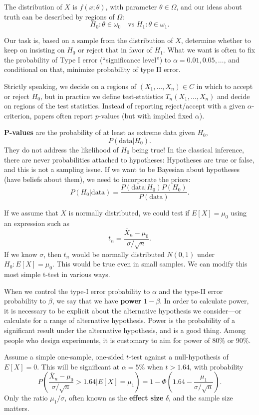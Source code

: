 \documentclass[twoside]{article}
\begin{document}
The distribution of $X$ is $f(x;\theta)$, with parameter
$\theta\in\Omega$, and our ideas about truth can be described by
regions of $\Omega$:
\[ H_0: \theta\in\omega_0 \quad \text{vs $H_1: \theta\in\omega_1$.}
\]

Our task is, based on a sample from the distribution of $X$, determine
whether to keep on insisting on $H_0$ or reject that in favor of
$H_1$. What we want is often to fix the probability of Type I error
(``significance level'') to $\alpha=0.01,0.05,\dots$, and conditional
on that, minimize probability of type II error.

Strictly speaking, we decide on a regions of $(X_1,\dots,X_n)\in C$ in
which to accept or reject $H_0$, but in practice we define
test-statistics $T_n(X_1,\dots,X_n)$ and decide on regions of the test
statistics.
Instead of reporting reject/accept with a given $\alpha$-criterion, papers often report $p$-values (but with
implied fixed $\alpha$). 

\textbf{P-values} are the probability of at least as extreme data given $H_0$,
\[ P( \text{data}| H_0).\]
They do not address the likelihood of $H_0$ being true!
In the classical inference, there are never probabilities attached to hypotheses: Hypotheses are true 
or false, and this is not a sampling issue.
If we want to be Bayesian about hypotheses (have beliefs about them), we need to incorporate the priors: 
\[ P(H_0|\text{data}) = \frac{ P(\text{data}|H_0) P(H_0)}{ P(\text{data}) }.
\]

If we assume that $X$ is normally distributed, we could 
test if $E[X] = \mu_0$ using an expression such as
\[
t_n = \frac{\overline{X}_n - \mu_0}{\sigma/\sqrt{n}}.
\]
If we know $\sigma$, then $t_n$ would be normally distributed $N(0,1)$ under $H_0: E[X]=\mu_0$. 
This would be true even in small samples.
We can modify this most simple t-test in various ways.


When we control the type-I error probability to $\alpha$ and the type-II error probability
to $\beta$, we say that we have \textbf{power} $1-\beta$. 
In order to calculate power, it is necessary to be explicit about the alternative hypothesis 
we consider---or calculate for a range of alternative hypothesis. 
Power is the probability of a significant result under the alternative hypothesis, and is a good thing. 
Among people who design experiments, it is customary to aim for power of 80\% or 90\%.

Assume a simple one-sample, one-sided $t$-test against a null-hypothesis of $E[X]=0$. This will
be significant at $\alpha=5\%$ when $t> 1.64$, with probability
\[
P\left( \frac{\overline{X}_n - \mu_0}{\sigma/\sqrt{n}} > 1.64 | E[X]=\mu_1\right) = 
1 - \Phi\left( 1.64 - \frac{\mu_1}{\sigma/\sqrt{n}}\right).
\]
Only the ratio $\mu_1/\sigma$, often known as the \textbf{effect size}  $\delta$, and the sample
size matters.
\end{document}
